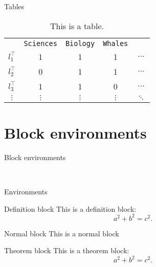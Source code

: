 \documentclass{beamer}
\begin{document}
\begin{frame}{Tables}

\begin{table}
\caption{This is a table.}
\begin{tabular}{c c c c c}
& \texttt{Sciences} & \texttt{Biology} & \texttt{Whales} & \\
$l_1^\top$ & 1 & 1 & 1 & $\dots$\\
$l_2^\top$ & 0 & 1 & 1 & $\dots$\\
$l_3^\top$ & 1 & 1 & 0 & $\dots$\\
$\vdots$ & $\vdots$ & $\vdots$ & $\vdots$ & $\ddots$ \\
\end{tabular}
\end{table}

\end{frame}


\section{Block environments}

\begin{frame}{Block environments}

\begin{enumerate}
\setlength{\itemsep}{40pt}
 \\
\end{enumerate}

\end{frame}


\begin{frame}{Environments}

\begin{defnt}{Definition block}
This is a definition block: $$a^2 + b^2 = c^2.$$
\end{defnt}

\begin{mblock}{Normal block}
This is a normal block
\end{mblock}

\begin{thm}{Theorem block}
This is a theorem block: $$a^2 + b^2 = c^2.$$
\end{thm}

\end{frame}
\end{document}
